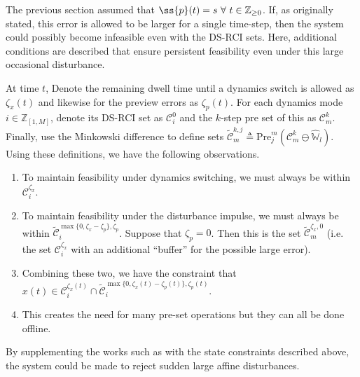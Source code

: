 The previous section assumed that $\ss{p}(t)=s\ \forall\ t\in\mathbb{Z}_{\geq 0}$. If, as originally stated, this error is allowed to be larger for a single time-step, then the system could possibly become infeasible even with the DS-RCI sets. Here, additional conditions are described that ensure persistent feasibility even under this large occasional disturbance.

At time $t$, Denote the remaining dwell time until a dynamics switch is allowed as $\zeta_x(t)$ and likewise for the preview errors as $\zeta_p(t)$. For each dynamics mode $i\in\mathbb{Z}_{[1,M]}$, denote its DS-RCI set as $\mathcal{C}_i^0$ and the $k$-step pre set of this as $\mathcal{C}_m^k$. Finally, use the Minkowski difference to define sets $\tilde{\mathcal{C}}^{k,j}_m\triangleq\text{Pre}^m_j(\mathcal{C}_m^k\ominus \widehat{\mathbb{W}}_l)$. Using these definitions, we have the following observations.
\begin{enumerate}
    \item To maintain feasibility under dynamics switching, we must always be within $\mathcal{C}_i^{\zeta_x}$.
    \item To maintain feasibility under the disturbance impulse, we must always be within $\tilde{\mathcal{C}}^{\max\{0, \zeta_x-\zeta_p\},\zeta_p}_i$. Suppose that $\zeta_p=0$. Then this is the set $\tilde{\mathcal{C}}^{\zeta_x,0}_m$ (i.e. the set $\mathcal{C}_i^{\zeta_x}$ with an additional ``buffer'' for the possible large error). 
    \item Combining these two, we have the constraint that $x(t)\in \mathcal{C}_i^{\zeta_x(t)}\cap \tilde{\mathcal{C}}^{\max\{0, \zeta_x(t)-\zeta_p(t)\},\zeta_p(t)}_i$.
    \item This creates the need for many pre-set operations but they can all be done offline.
\end{enumerate}
By supplementing the works such as \cite{Danielson2019} with the state constraints described above, the system could be made to reject sudden large affine disturbances. 